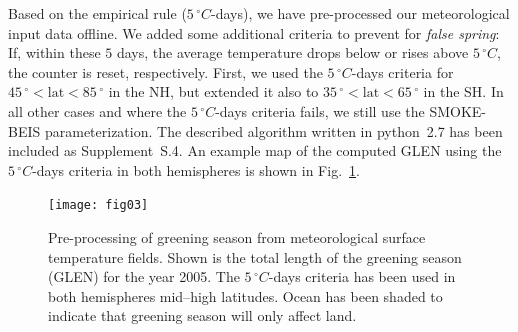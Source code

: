 \documentclass[gmd, manuscript]{copernicus}
\begin{document}
Based on the empirical rule ($5\,\unit{^\circ C}$-days), we have pre-processed our meteorological input data offline. We added some additional criteria to prevent for \emph{false spring}: If, within these $5$ days, the average temperature drops below or rises above $5\,\unit{^\circ C}$, the counter is reset, respectively. First, we used the $5\,\unit{^\circ C}$-days criteria for $45\,\unit{^\circ} < \text{lat} < 85\,\unit{^\circ}$ in the NH, but extended it also to $35\,\unit{^\circ} < \text{lat} < 65\,\unit{^\circ}$ in the SH. In all other cases and where the $5\,\unit{^\circ C}$-days criteria fails, we still use the SMOKE-BEIS parameterization. The described algorithm written in python~2.7 has been included as Supplement~S.4. An example map of the computed GLEN using the $5\,\unit{^\circ C}$-days criteria in both hemispheres is shown in Fig.~\ref{fig:glen_2015_she}.
%
\begin{figure}[t]
  \texttt{[image: fig03]}
  \caption{Pre-processing of greening season from meteorological surface temperature fields. Shown is the total length of the greening season (GLEN) for the year 2005. The $5\,\unit{^\circ C}$-days criteria has been used in both hemispheres mid--high latitudes. Ocean has been shaded to indicate that greening season will only affect land.}
  \label{fig:glen_2015_she}
\end{figure}
%
\end{document}
